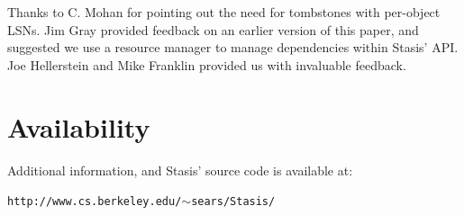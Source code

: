 \documentclass[letterpaper,twocolumn,10pt]{article}
\newcommand{\yad}{Stasis\xspace}
\newcommand{\yads}{Stasis'\xspace}
\begin{document}
Thanks to C. Mohan for pointing out the need for tombstones with
per-object LSNs.  Jim Gray provided feedback on an earlier version of
this paper, and suggested we use a resource manager to manage
dependencies within \yads API.  Joe Hellerstein and Mike Franklin
provided us with invaluable feedback.

\section{Availability}

Additional information, and \yads source code is available at:

\begin{center}
{\small{\tt http://www.cs.berkeley.edu/\ensuremath{\sim}sears/\yad/}}
\end{center}

{\footnotesize 
\nocite{*}
}

\theendnotes
\end{document}
